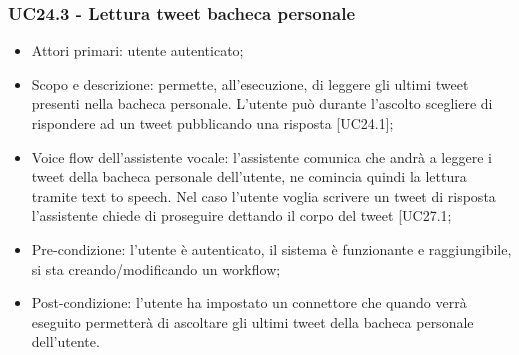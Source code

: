 \subsubsection{UC24.3 - Lettura tweet bacheca personale}
\begin{itemize}
	\item  Attori primari: utente autenticato;
	\item  Scopo e descrizione: permette, all'esecuzione, di leggere gli ultimi tweet presenti nella bacheca personale. L'utente può durante l'ascolto scegliere di rispondere ad un tweet pubblicando una risposta [UC24.1];
	\item  Voice flow dell'assistente vocale: l'assistente comunica che andrà a leggere i tweet della bacheca personale dell'utente, ne comincia quindi la lettura tramite text to speech. Nel caso l'utente voglia scrivere un tweet di risposta l'assistente chiede di proseguire dettando il corpo del tweet [UC27.1;
	\item  Pre-condizione: l'utente è autenticato, il sistema è funzionante e raggiungibile, si sta creando/modificando un workflow;
	\item  Post-condizione: l'utente ha impostato un connettore che quando verrà eseguito permetterà di ascoltare gli ultimi tweet della bacheca personale dell'utente.
\end{itemize}

